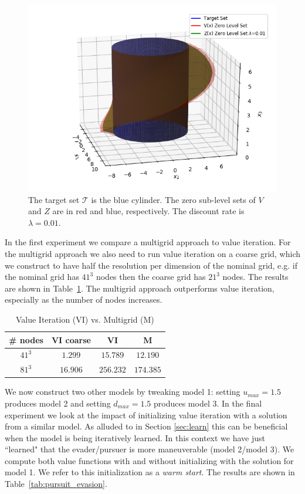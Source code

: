 \begin{figure}
\includegraphics[scale=0.5]{air_3D.png}
\caption{The target set $\mathcal{T}$ is the blue cylinder. The zero sub-level sets of $V$ and $Z$ are in red and blue, respectively. The discount rate is $\lambda=0.01$.}
\label{fig:air3D}
\end{figure}

In the first experiment we compare a multigrid approach{} to value iteration. For the multigrid approach we also need to run value iteration on a coarse grid, which we construct to have half the resolution per dimension of the nominal grid, e.g. if the nominal grid has $41^3$ nodes then the coarse grid has $21^3$ nodes. The results are shown in Table~\ref{tab:multigrid}. The multigrid approach outperforms value iteration, especially as the number of nodes increases.

\begin{table}
\centering
\caption{Value Iteration (VI) vs. Multigrid (M)}
\label{tab:multigrid}
\begin{tabular}{|c| c| c| c| }
\hline
\# nodes &  VI coarse & VI & M \\ \hline
$41^3$ &$1.299$ &$15.789$  & $12.190$ \\ \hline
$81^3$ &$16.906$&$256.232$  & $174.385$ \\ \hline
\end{tabular}
\end{table}

We now construct two other models by tweaking model 1: setting $u_{max}=1.5$ produces model 2 and setting $d_{max}=1.5$ produces model 3. In the final experiment we look at the impact of initializing value iteration with a solution from a similar model. As alluded to in Section \ref{sec:learn} this can be beneficial when the model is being iteratively learned. In this context we have just ``learned" that the evader/pursuer is more maneuverable (model 2/model 3). We compute both value functions with and without initializing with the solution for model 1. We refer to this initialization as a \emph{warm start}. The results are shown in Table~\ref{tab:pursuit_evasion}.

